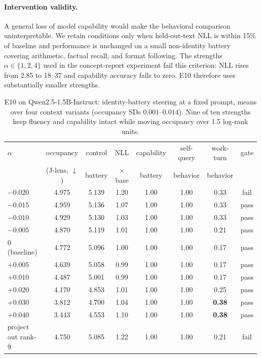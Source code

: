 \documentclass{article}
\newcommand{\jlens}{J\mbox{-}lens}
\begin{document}
\paragraph{Intervention validity.} A general loss of model capability would make the behavioral comparison uninterpretable. We retain conditions only when held-out-text NLL is within 15\% of baseline and performance is unchanged on a small non-identity battery covering arithmetic, factual recall, and format following. The strengths $\alpha\in\{1,2,4\}$ used in the concept-report experiment fail this criterion: NLL rises from 2.85 to 18--37 and capability accuracy falls to zero. E10 therefore uses substantially smaller strengths.

\begin{table}[h]
\centering\small
\begin{tabular}{lccccccc}
\toprule
$\alpha$ & occupancy & control & NLL & capability & self-query & work-turn & gate \\
 & (\jlens{}, $\downarrow$) & battery & $\times$base & battery & behavior & behavior & \\
\midrule
$-0.020$ & 4.975 & 5.139 & 1.20 & 1.00 & 1.00 & 0.33 & fail \\
$-0.015$ & 4.959 & 5.136 & 1.07 & 1.00 & 1.00 & 0.33 & pass \\
$-0.010$ & 4.929 & 5.130 & 1.03 & 1.00 & 1.00 & 0.33 & pass \\
$-0.005$ & 4.870 & 5.119 & 1.01 & 1.00 & 1.00 & 0.21 & pass \\
$0$ (baseline) & 4.772 & 5.096 & 1.00 & 1.00 & 1.00 & 0.17 & pass \\
$+0.005$ & 4.639 & 5.058 & 0.99 & 1.00 & 1.00 & 0.17 & pass \\
$+0.010$ & 4.487 & 5.001 & 0.99 & 1.00 & 1.00 & 0.17 & pass \\
$+0.020$ & 4.170 & 4.853 & 1.01 & 1.00 & 1.00 & 0.25 & pass \\
$+0.030$ & 3.812 & 4.700 & 1.04 & 1.00 & 1.00 & \textbf{0.38} & pass \\
$+0.040$ & 3.443 & 4.553 & 1.10 & 1.00 & 1.00 & \textbf{0.38} & pass \\
\midrule
project out rank-9 & 4.750 & 5.085 & 1.22 & 1.00 & 1.00 & 0.21 & fail \\
\bottomrule
\end{tabular}
\caption{E10 on Qwen2.5-1.5B-Instruct: identity-battery steering at a fixed prompt, means over four context variants (occupancy SDs $0.001$--$0.014$). Nine of ten strengths keep fluency and capability intact while moving occupancy over 1.5 log-rank units.}
\label{tab:e10}
\end{table}
\end{document}
